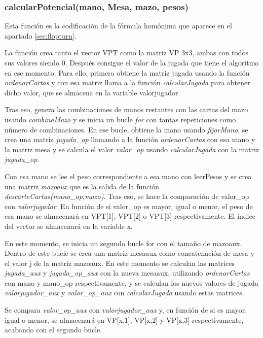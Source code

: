 \subsubsection{calcularPotencial(mano, Mesa, mazo, pesos)}

Esta función es la codificación de la fórmula homónima que aparece en el apartado \ref{sec:flopturn}.

La función crea tanto el vector VPT como la matriz VP 3x3, ambas con todos sus valores siendo 0. Después consigue el valor de la jugada que tiene el algoritmo en ese momento. Para ello, primero obtiene la matriz jugada usando la función \textit{ordenarCartas} y con esa matriz llama a la función \textit{calcularJugada} para obtener dicho valor, que se almacena en la variable valorjugador.

Tras eso, genera las combinaciones de manos restantes con las cartas del mazo usando \textit{combinaMazo} y se inicia un bucle \textit{for} con tantas repeticiones como número de combinaciones. En ese bucle, obtiene la mano usando \textit{fijarMano}, se crea una matriz \textit{jugada\_op} llamando a la función \textit{ordenarCartas} con esa mano y la matriz mesa y se calcula el valor \textit{valor\_op} usando \textit{calcularJugada} con la matriz \textit{jugada\_op}.

Con esa mano se lee el peso correspondiente a esa mano con leerPesos y se crea una matriz \textit{mazoaux} que es la salida de la función \textit{descarteCartas(mano\_op,mazo)}. Tras eso, se hace la comparación de valor\_op con \textit{valorjugador}. En función de si valor\_op es mayor, igual o menor, el peso de esa mano se almacenará en VPT[1], VPT[2] o VPT[3] respectivamente. El índice del vector se almacenará en la variable x.

En este momento, se inicia un segundo bucle for con el tamaño de mazoaux. Dentro de este bucle se crea una matriz mesaaux como concatenación de mesa y el valor j de la matriz mazoaux. En este momento se calculan las matrices \textit{jugada\_aux} y \textit{jugada\_op\_aux} con la nueva mesaaux, utilizando \textit{ordenarCartas} con mano y mano\_op respectivamente, y se calculan los nuevos valores de jugada \textit{valorjugador\_aux} y \textit{valor\_op\_aux} con \textit{calcularJugada} usando estas matrices. 

Se compara \textit{valor\_op\_aux} con \textit{valorjugador\_aux} y, en función de si es mayor, igual o menor, se almacenará en VP[x,1], VP[x,2] y VP[x,3] respectivamente, acabando con el segundo bucle.

